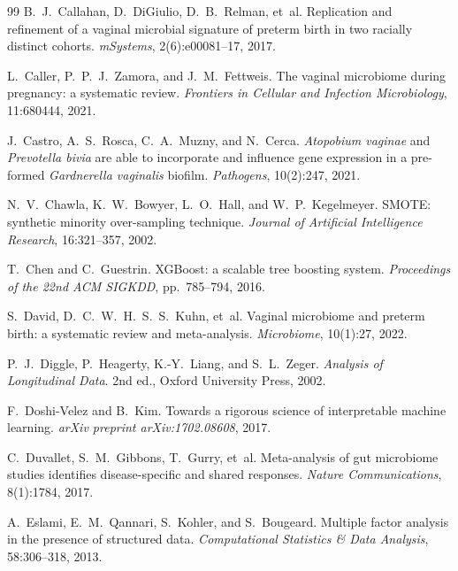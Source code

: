 \documentclass[12pt,a4paper]{report}
\begin{document}
\begin{thebibliography}{99}
B.~J.~Callahan, D.~DiGiulio, D.~B.~Relman, et~al.
\newblock Replication and refinement of a vaginal microbial signature of preterm birth in two racially distinct cohorts.
\newblock \textit{mSystems}, 2(6):e00081--17, 2017.

L.~Caller, P.~P.~J.~Zamora, and J.~M.~Fettweis.
\newblock The vaginal microbiome during pregnancy: a systematic review.
\newblock \textit{Frontiers in Cellular and Infection Microbiology}, 11:680444, 2021.

J.~Castro, A.~S.~Rosca, C.~A.~Muzny, and N.~Cerca.
\newblock \textit{Atopobium vaginae} and \textit{Prevotella bivia} are able to incorporate and influence gene expression in a pre-formed \textit{Gardnerella vaginalis} biofilm.
\newblock \textit{Pathogens}, 10(2):247, 2021.

N.~V.~Chawla, K.~W.~Bowyer, L.~O.~Hall, and W.~P.~Kegelmeyer.
\newblock SMOTE: synthetic minority over-sampling technique.
\newblock \textit{Journal of Artificial Intelligence Research}, 16:321--357, 2002.

T.~Chen and C.~Guestrin.
\newblock XGBoost: a scalable tree boosting system.
\newblock \textit{Proceedings of the 22nd ACM SIGKDD}, pp.~785--794, 2016.

S.~David, D.~C.~W.~H.~S.~S.~Kuhn, et~al.
\newblock Vaginal microbiome and preterm birth: a systematic review and meta-analysis.
\newblock \textit{Microbiome}, 10(1):27, 2022.

P.~J.~Diggle, P.~Heagerty, K.-Y.~Liang, and S.~L.~Zeger.
\newblock \textit{Analysis of Longitudinal Data}. 2nd ed., Oxford University Press, 2002.

F.~Doshi-Velez and B.~Kim.
\newblock Towards a rigorous science of interpretable machine learning.
\newblock \textit{arXiv preprint arXiv:1702.08608}, 2017.

C.~Duvallet, S.~M.~Gibbons, T.~Gurry, et~al.
\newblock Meta-analysis of gut microbiome studies identifies disease-specific and shared responses.
\newblock \textit{Nature Communications}, 8(1):1784, 2017.

A.~Eslami, E.~M.~Qannari, S.~Kohler, and S.~Bougeard.
\newblock Multiple factor analysis in the presence of structured data.
\newblock \textit{Computational Statistics \& Data Analysis}, 58:306--318, 2013.


\end{thebibliography}
\end{document}
